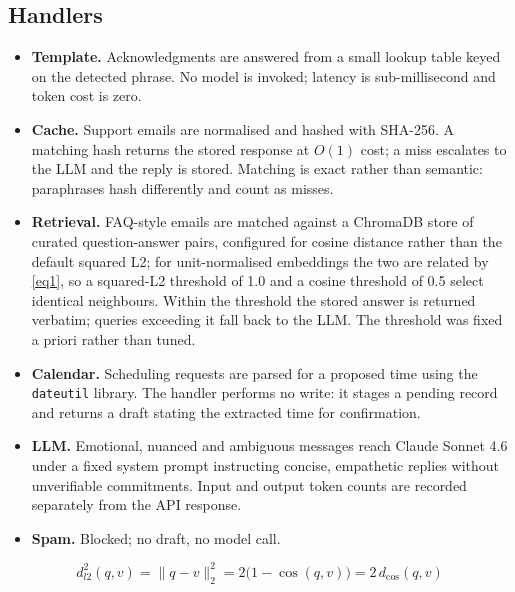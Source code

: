 \documentclass[conference]{IEEEtran}
\begin{document}
\subsection{Handlers}
\begin{itemize}
\setlength\itemsep{2pt}
\item \textbf{Template.} Acknowledgments are answered from a small lookup table keyed on the detected phrase. No model is invoked; latency is sub-millisecond and token cost is zero.
\item \textbf{Cache.} Support emails are normalised and hashed with SHA-256. A matching hash returns the stored response at $O(1)$ cost; a miss escalates to the LLM and the reply is stored. Matching is exact rather than semantic: paraphrases hash differently and count as misses.
\item \textbf{Retrieval.} FAQ-style emails are matched against a ChromaDB store of curated question-answer pairs, configured for cosine distance rather than the default squared L2; for unit-normalised embeddings the two are related by \eqref{eq1}, so a squared-L2 threshold of 1.0 and a cosine threshold of 0.5 select identical neighbours. Within the threshold the stored answer is returned verbatim; queries exceeding it fall back to the LLM. The threshold was fixed a priori rather than tuned.
\item \textbf{Calendar.} Scheduling requests are parsed for a proposed time using the \texttt{dateutil} library. The handler performs no write: it stages a pending record and returns a draft stating the extracted time for confirmation.
\item \textbf{LLM.} Emotional, nuanced and ambiguous messages reach Claude Sonnet 4.6 under a fixed system prompt instructing concise, empathetic replies without unverifiable commitments. Input and output token counts are recorded separately from the API response.
\item \textbf{Spam.} Blocked; no draft, no model call.
\end{itemize}

\begin{equation}
d_{l2}^{2}(q,v) = \lVert q - v \rVert_2^2 = 2\bigl(1-\cos(q,v)\bigr) = 2\,d_{\cos}(q,v)
\label{eq1}
\end{equation}
\end{document}
